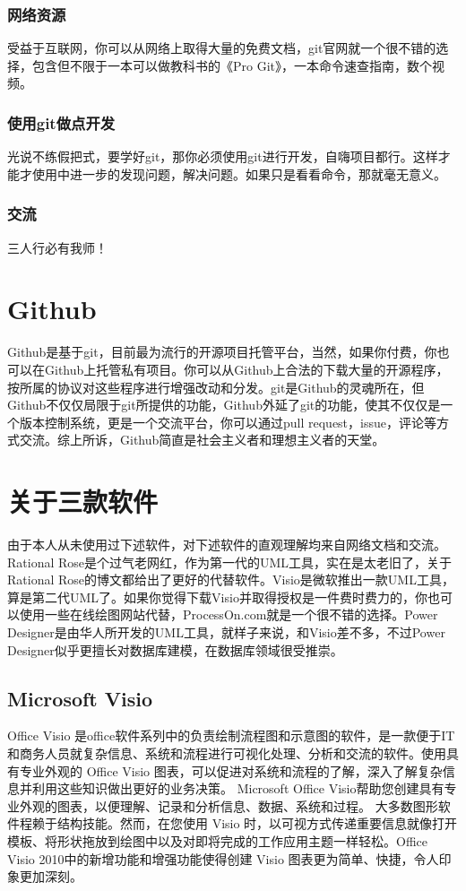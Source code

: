 \documentclass{article}
\begin{document}
	\subsubsection{网络资源}
	受益于互联网，你可以从网络上取得大量的免费文档，git官网就一个很不错的选择，包含但不限于一本可以做教科书的《Pro Git》，一本命令速查指南，数个视频。
	\subsubsection{使用git做点开发}
	光说不练假把式，要学好git，那你必须使用git进行开发，自嗨项目都行。这样才能才使用中进一步的发现问题，解决问题。如果只是看看命令，那就毫无意义。
	\subsubsection{交流}
	三人行必有我师！
	\section{Github}
	Github是基于git，目前最为流行的开源项目托管平台，当然，如果你付费，你也可以在Github上托管私有项目。你可以从Github上合法的下载大量的开源程序，按所属的协议对这些程序进行增强改动和分发。git是Github的灵魂所在，但Github不仅仅局限于git所提供的功能，Github外延了git的功能，使其不仅仅是一个版本控制系统，更是一个交流平台，你可以通过pull request，issue，评论等方式交流。综上所诉，Github简直是社会主义者和理想主义者的天堂。
	\section{关于三款软件}
	由于本人从未使用过下述软件，对下述软件的直观理解均来自网络文档和交流。Rational Rose是个过气老网红，作为第一代的UML工具，实在是太老旧了，关于Rational Rose的博文都给出了更好的代替软件。Visio是微软推出一款UML工具，算是第二代UML了。如果你觉得下载Visio并取得授权是一件费时费力的，你也可以使用一些在线绘图网站代替，ProcessOn.com就是一个很不错的选择。Power Designer是由华人所开发的UML工具，就样子来说，和Visio差不多，不过Power Designer似乎更擅长对数据库建模，在数据库领域很受推崇。
	\subsection{Microsoft Visio}
	Office Visio 是office软件系列中的负责绘制流程图和示意图的软件，是一款便于IT和商务人员就复杂信息、系统和流程进行可视化处理、分析和交流的软件。使用具有专业外观的 Office Visio 图表，可以促进对系统和流程的了解，深入了解复杂信息并利用这些知识做出更好的业务决策。
	Microsoft Office Visio帮助您创建具有专业外观的图表，以便理解、记录和分析信息、数据、系统和过程。
	大多数图形软件程赖于结构技能。然而，在您使用 Visio 时，以可视方式传递重要信息就像打开模板、将形状拖放到绘图中以及对即将完成的工作应用主题一样轻松。Office Visio 2010中的新增功能和增强功能使得创建 Visio 图表更为简单、快捷，令人印象更加深刻。
\end{document}
